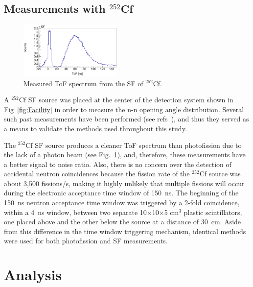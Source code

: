 \documentclass[%
 reprint,
 amsmath,amssymb,
 aps,
 nofootinbib
]{revtex4-1}
\begin{document}
\subsection{Measurements with $^{252}$Cf}
\begin{figure}[h]
\includegraphics[width=0.45\textwidth]{Cf252ToF.png}
\caption{Measured ToF spectrum from the SF of $^{252}$Cf.}
\label{fig:Cf252ToF}
\end{figure}
A $^{252}$Cf SF source was placed at the center of the detection system shown in Fig~\ref{fig:Facility} in order to measure the n-n opening angle distribution.
Several such past measurements have been performed (see refs~\cite{1975Cf252, Pozzi2014, 2008CF252, Verbeke2018}), and thus they served as a means to validate the methods used throughout this study.

The $^{252}$Cf SF source produces a cleaner ToF spectrum than photofission due to the lack of a photon beam (see Fig.~\ref{fig:Cf252ToF}), and, therefore, these measurements have a better signal to noise ratio.
Also, there is no concern over the detection of accidental neutron coincidences because the fission rate of the $^{252}$Cf source was about 3,500 fissions/s, making it highly unlikely that multiple fissions will occur during the electronic acceptance time window of 150~ns.
The beginning of the 150~ns neutron acceptance time window was triggered by a 2-fold coincidence, within a 4~ns window, between two separate 10$\times$10$\times$5 cm$^3$ plastic scintillators, one placed above and the other below the source at a distance of 30~cm.
Aside from this difference in the time window triggering mechanism, identical methods were used for both photofission and SF measurements.
\FloatBarrier

\section{Analysis}
\label{Analysis}
\end{document}
